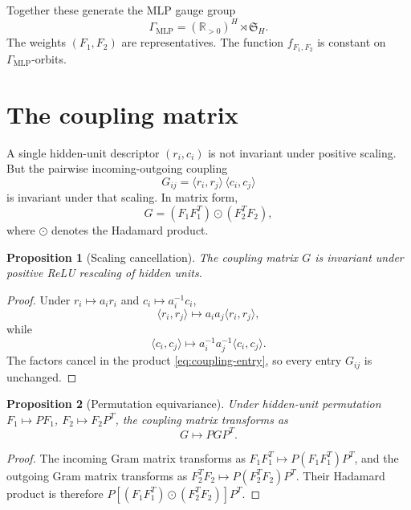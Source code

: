 \documentclass[11pt]{article}
\newtheorem{proposition}{Proposition}
\newcommand{\R}{\mathbb{R}}
\newcommand{\Sym}{\mathfrak{S}}
\newcommand{\MLP}{\mathrm{MLP}}
\newcommand{\Had}{\odot}
\begin{document}
Together these generate the MLP gauge group
\begin{equation}
  \Gamma_{\MLP}=(\R_{>0})^H\rtimes \Sym_H.
  \label{eq:gauge-group}
\end{equation}
The weights $(F_1,F_2)$ are representatives. The function $f_{F_1,F_2}$ is constant on $\Gamma_{\MLP}$-orbits.

\section{The coupling matrix}

A single hidden-unit descriptor $(r_i,c_i)$ is not invariant under positive scaling. But the pairwise incoming-outgoing coupling
\begin{equation}
  G_{ij}=\langle r_i,r_j\rangle\,\langle c_i,c_j\rangle
  \label{eq:coupling-entry}
\end{equation}
is invariant under that scaling. In matrix form,
\begin{equation}
  G=(F_1F_1^T)\Had(F_2^TF_2),
  \label{eq:coupling}
\end{equation}
where $\Had$ denotes the Hadamard product.

\begin{proposition}[Scaling cancellation]
The coupling matrix $G$ is invariant under positive ReLU rescaling of hidden units.
\end{proposition}

\begin{proof}
Under $r_i\mapsto a_ir_i$ and $c_i\mapsto a_i^{-1}c_i$,
\[
\langle r_i,r_j\rangle\mapsto a_ia_j\langle r_i,r_j\rangle,
\]
while
\[
\langle c_i,c_j\rangle\mapsto a_i^{-1}a_j^{-1}\langle c_i,c_j\rangle.
\]
The factors cancel in the product \eqref{eq:coupling-entry}, so every entry $G_{ij}$ is unchanged.
\end{proof}

\begin{proposition}[Permutation equivariance]
Under hidden-unit permutation $F_1\mapsto PF_1$, $F_2\mapsto F_2P^T$, the coupling matrix transforms as
\[
G\mapsto PGP^T.
\]
\end{proposition}

\begin{proof}
The incoming Gram matrix transforms as $F_1F_1^T\mapsto P(F_1F_1^T)P^T$, and the outgoing Gram matrix transforms as $F_2^TF_2\mapsto P(F_2^TF_2)P^T$. Their Hadamard product is therefore $P[(F_1F_1^T)\Had(F_2^TF_2)]P^T$.
\end{proof}
\end{document}
